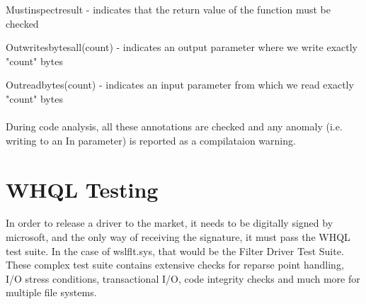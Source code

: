         \textunderscore Must\textunderscore inspect\textunderscore result\textunderscore
        - indicates that the return value of the function must be checked

        \textunderscore Out\textunderscore writes\textunderscore bytes\textunderscore all\textunderscore (count)
        - indicates an output parameter where we write exactly "count" bytes

        \textunderscore Out\textunderscore read\textunderscore bytes\textunderscore (count)
        - indicates an input parameter from which we read exactly "count" bytes

        \paragraph{}
        During code analysis, all these annotations are checked and any anomaly (i.e. writing to an \textunderscore In\textunderscore {} parameter) is
        reported as a compilataion warning.

    \section{WHQL Testing}
        In order to release a driver to the market, it needs to be digitally signed by microsoft, and the only way of receiving the signature, it
        must pass the WHQL test suite. In the case of wslflt.sys, that would be the Filter Driver Test Suite. These complex test suite
        contains extensive checks for reparse point handling, I/O stress conditions, transactional I/O, code integrity checks and much more for
        multiple file systems.
